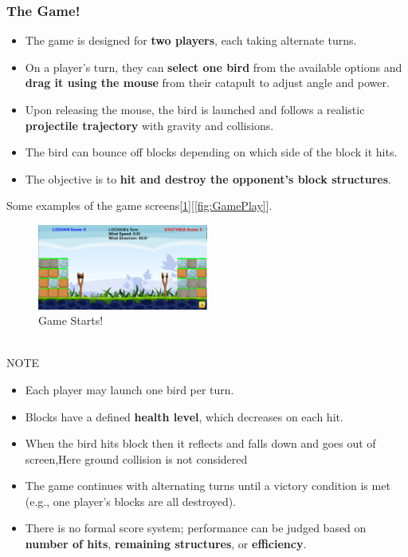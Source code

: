 \documentclass[10pt]{article}
\begin{document}
    \subsubsection{The Game!}
    \begin{itemize}
        \item The game is designed for \textbf{two players}, each taking alternate turns.
        \item On a player's turn, they can \textbf{select one bird} from the available options and \textbf{drag it using the mouse} from their catapult to adjust angle and power.
        \item Upon releasing the mouse, the bird is launched and follows a realistic \textbf{projectile trajectory} with gravity and collisions.
        \item The bird can bounce off blocks depending on which side of the block it hits.
        \item The objective is to \textbf{hit and destroy the opponent’s block structures}.
    \end{itemize}
    Some examples of the game screens[\ref{fig:GameStart}][\ref{fig:GamePlay}].
    \begin{figure}[h!]
        \centering
        \includegraphics[width=0.5\textwidth]{GameStart}
        \caption{Game Starts!}\label{fig:GameStart}
    \end{figure}\\
    NOTE\\
    \begin{itemize}
    \item Each player may launch one bird per turn.
    \item Blocks have a defined \textbf{health level}, which decreases on each hit.
    \item When the bird hits block then it reflects and falls down and goes out of screen,Here ground collision is not considered
    \item The game continues with alternating turns until a victory condition is met (e.g., one player’s blocks are all destroyed).
    \item There is no formal score system; performance can be judged based on \textbf{number of hits}, \textbf{remaining structures}, or \textbf{efficiency}.
    \end{itemize}
\end{document}
